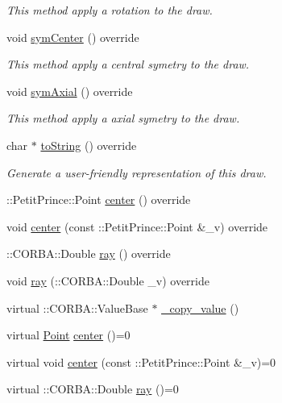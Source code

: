 \begin{DoxyCompactItemize}
\begin{DoxyCompactList}\small\item\em This method apply a rotation to the draw. \end{DoxyCompactList}\item 
void \hyperlink{class_circle_a4bbc6fc3d759edda13e253240e8dcacf}{sym\+Center} () override
\begin{DoxyCompactList}\small\item\em This method apply a central symetry to the draw. \end{DoxyCompactList}\item 
void \hyperlink{class_circle_a4b74442abd9f3f76bbb5655b3003beec}{sym\+Axial} () override
\begin{DoxyCompactList}\small\item\em This method apply a axial symetry to the draw. \end{DoxyCompactList}\item 
char $\ast$ \hyperlink{class_circle_a5672abf3a344e988acf8b1eec13512b9}{to\+String} () override
\begin{DoxyCompactList}\small\item\em Generate a user-\/friendly representation of this draw. \end{DoxyCompactList}\item 
\+::Petit\+Prince\+::\+Point \hyperlink{class_circle_a3c50bcfe91b3c635a92bdab41a52c8b6}{center} () override
\item 
void \hyperlink{class_circle_ae1d58af117d8228a91f0aabd8c92a97e}{center} (const \+::Petit\+Prince\+::\+Point \&\+\_\+v) override
\item 
\+::C\+O\+R\+B\+A\+::\+Double \hyperlink{class_circle_ac5d62ae3368cd16552b77454095bb618}{ray} () override
\item 
void \hyperlink{class_circle_ae29e5eb504877615d1268cfac04bcb12}{ray} (\+::C\+O\+R\+B\+A\+::\+Double \+\_\+v) override
\item 
virtual \+::C\+O\+R\+B\+A\+::\+Value\+Base $\ast$ \hyperlink{class_circle_a77491043677d6e55c0647af478178bb3}{\+\_\+copy\+\_\+value} ()
\item 
virtual \hyperlink{struct_point}{Point} \hyperlink{class_circle_a7e6386f745d6255a2ddec2a53ff514b7}{center} ()=0
\item 
virtual void \hyperlink{class_circle_a9c4d4e9ec2a2e59f0c8d0c3f36e10edc}{center} (const \+::Petit\+Prince\+::\+Point \&\+\_\+v)=0
\item 
virtual \+::C\+O\+R\+B\+A\+::\+Double \hyperlink{class_circle_a1ddff289fde40dc6c25963c0c7b8d985}{ray} ()=0

\end{DoxyCompactItemize}

